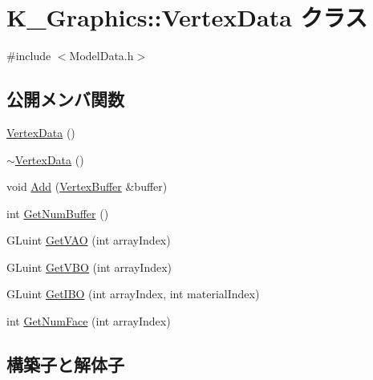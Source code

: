 \hypertarget{class_k___graphics_1_1_vertex_data}{}\section{K\+\_\+\+Graphics\+:\+:Vertex\+Data クラス}
\label{class_k___graphics_1_1_vertex_data}


{\ttfamily \#include $<$Model\+Data.\+h$>$}

\subsection*{公開メンバ関数}
\begin{DoxyCompactItemize}
\item 
\mbox{\hyperlink{class_k___graphics_1_1_vertex_data_af63d3c3260ab4dc6206b5c92c21cc1de}{Vertex\+Data}} ()
\item 
\mbox{\hyperlink{class_k___graphics_1_1_vertex_data_ae879791e7e458a0ac7de00b6fa75aba1}{$\sim$\+Vertex\+Data}} ()
\item 
void \mbox{\hyperlink{class_k___graphics_1_1_vertex_data_a035bc83ff770da79ce486c9bed22a8fb}{Add}} (\mbox{\hyperlink{struct_k___graphics_1_1_vertex_buffer}{Vertex\+Buffer}} \&buffer)
\item 
int \mbox{\hyperlink{class_k___graphics_1_1_vertex_data_a8cbc66ef420984b5bb1b60fcec26c574}{Get\+Num\+Buffer}} ()
\item 
G\+Luint \mbox{\hyperlink{class_k___graphics_1_1_vertex_data_ac19a99821b1e3ed0ec16fdade13694d7}{Get\+V\+AO}} (int array\+Index)
\item 
G\+Luint \mbox{\hyperlink{class_k___graphics_1_1_vertex_data_a56ad045ab3baf95d6954c6ad1386a44d}{Get\+V\+BO}} (int array\+Index)
\item 
G\+Luint \mbox{\hyperlink{class_k___graphics_1_1_vertex_data_a33c0db86f835bc00362eafaecd255cea}{Get\+I\+BO}} (int array\+Index, int material\+Index)
\item 
int \mbox{\hyperlink{class_k___graphics_1_1_vertex_data_af5ee3ddc1b8c13379cd73584de77530e}{Get\+Num\+Face}} (int array\+Index)
\end{DoxyCompactItemize}


\subsection{構築子と解体子}
\mbox{\label{class_k___graphics_1_1_vertex_data_af63d3c3260ab4dc6206b5c92c21cc1de}} 
